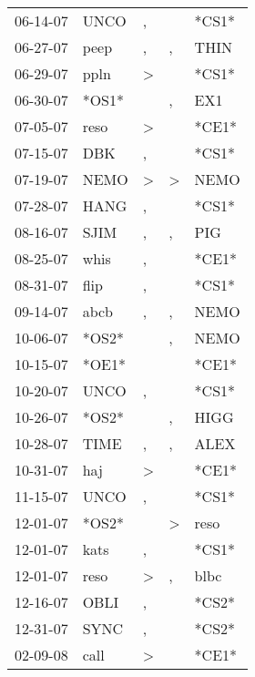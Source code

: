 \begin{supertabular}{lllll}
 06-14-07 &   UNCO &             , &               &  *CS1* \\
 06-27-07 &   peep &             , &             , &   THIN \\
 06-29-07 &   ppln &  \textgreater &               &  *CS1* \\
 06-30-07 &  *OS1* &               &             , &    EX1 \\
 07-05-07 &   reso &  \textgreater &               &  *CE1* \\
 07-15-07 &    DBK &             , &               &  *CS1* \\
 07-19-07 &   NEMO &  \textgreater &  \textgreater &   NEMO \\
 07-28-07 &   HANG &             , &               &  *CS1* \\
 08-16-07 &   SJIM &             , &             , &    PIG \\
 08-25-07 &   whis &             , &               &  *CE1* \\
 08-31-07 &   flip &             , &               &  *CS1* \\
 09-14-07 &   abcb &             , &             , &   NEMO \\
 10-06-07 &  *OS2* &               &             , &   NEMO \\
 10-15-07 &  *OE1* &               &               &  *CE1* \\
 10-20-07 &   UNCO &             , &               &  *CS1* \\
 10-26-07 &  *OS2* &               &             , &   HIGG \\
 10-28-07 &   TIME &             , &             , &   ALEX \\
 10-31-07 &    haj &  \textgreater &               &  *CE1* \\
 11-15-07 &   UNCO &             , &               &  *CS1* \\
 12-01-07 &  *OS2* &               &  \textgreater &   reso \\
 12-01-07 &   kats &             , &               &  *CS1* \\
 12-01-07 &   reso &  \textgreater &             , &   blbc \\
 12-16-07 &   OBLI &             , &               &  *CS2* \\
 12-31-07 &   SYNC &             , &               &  *CS2* \\
 02-09-08 &   call &  \textgreater &               &  *CE1* \\

\end{supertabular}
